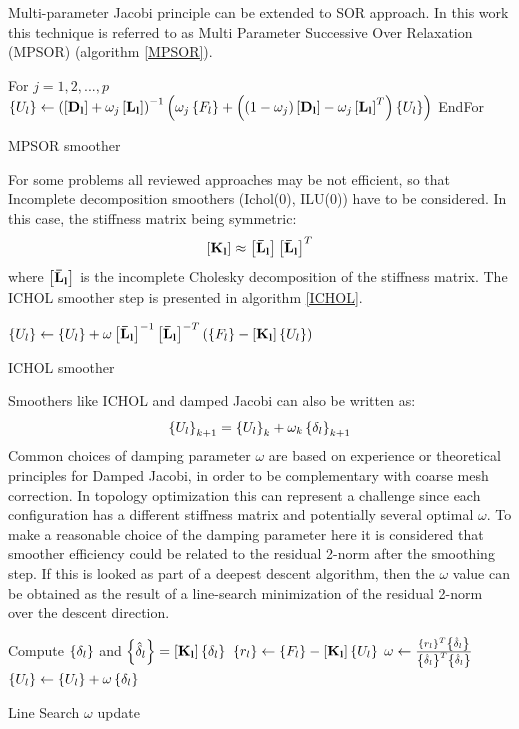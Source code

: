Multi-parameter Jacobi principle can be extended to SOR approach. In this work this technique is referred to as Multi Parameter Successive Over Relaxation (MPSOR) (algorithm \ref{MPSOR}).
 \clearpage
 \begin{algorithm} 
 For $j=1,2,...,p$\;
        $\left\lbrace{U_{l}}\right \rbrace\gets\left(\left[{\mathbf{D_{l}}}\right]+\omega_j\left[{\mathbf{L_{l}}}\right]\right)^{-1}\left(\omega_j\left\lbrace{F_{l}}\right \rbrace+\left((1-\omega_j)\left[{\mathbf{D_{l}}}\right]-\omega_j\left[{\mathbf{L_{l}}}\right]^T\right)\left\lbrace{U_{l}}\right \rbrace\right)$\;
        EndFor\;
        \caption{MPSOR smoother\label{MPSOR}}
 \end{algorithm}
 For some problems all reviewed approaches may be not efficient, so that Incomplete decomposition smoothers (Ichol(0), ILU(0)) have to be considered. In this case, the stiffness matrix being symmetric:
 \begin{equation}
 \left[{\mathbf{K_{l}}}\right]\approx \left[{\mathbf{\bar{L}_{l}}}\right]\left[{\mathbf{\bar{L}_{l}}}\right]^T
 \end{equation}
 where $\left[{\mathbf{\bar{L}_{l}}}\right]$ is the incomplete Cholesky decomposition of the stiffness matrix. 
 The ICHOL smoother step is presented in algorithm \ref{ICHOL}.
 \begin{algorithm} 
      $\left\lbrace{U_{l}}\right \rbrace\gets\left\lbrace{U_{l}}\right \rbrace+\omega\left[{\mathbf{\bar{L}_{l}}}\right]^{-1}{\left[{\mathbf{\bar{L}_{l}}}\right]}^{-T}\left(\left\lbrace{F_{l}}\right \rbrace-\left[{\mathbf{K_{l}}}\right]\left\lbrace{U_{l}}\right \rbrace\right)$\;
         \caption{ICHOL smoother\label{ICHOL}}
  \end{algorithm}
 Smoothers like ICHOL and damped Jacobi can also be written as:
 \begin{equation}
 \left\lbrace{U_{l}}\right \rbrace_{k+1}=\left\lbrace{U_{l}}\right \rbrace_{k}+\omega_k\left\lbrace{\delta_{l}}\right \rbrace_{k+1}
 \end{equation}
 Common choices of damping parameter $\omega$ are based on experience or theoretical principles for Damped Jacobi, in order to be complementary with coarse mesh correction. In topology optimization this can represent a challenge since each configuration has a different stiffness matrix and potentially several optimal $\omega$. To make a reasonable choice of the damping parameter here it is considered that smoother efficiency could be related to the residual 2-norm after the smoothing step. If this is looked as part of a deepest descent algorithm, then the $\omega$ value can be obtained as the result of a line-search minimization of the residual 2-norm over the descent direction. 
  \begin{algorithm} 
  Compute $\left\lbrace{\delta_{l}}\right \rbrace$ and $\left\lbrace{\hat{\delta}_{l}}\right \rbrace=\left[{\mathbf{K_{l}}}\right]\left\lbrace{\delta_{l}}\right \rbrace$\;
  $\left\lbrace{r_{l}}\right \rbrace\gets\left\lbrace{F_{l}}\right \rbrace-\left[{\mathbf{K_{l}}}\right]\left\lbrace{U_{l}}\right \rbrace$\;
  	$\omega\gets\frac{\left\lbrace{r_{l}}\right \rbrace^T\left\lbrace{\hat{\delta}_{l}}\right \rbrace}{\left\lbrace{\hat{\delta}_{l}}\right \rbrace^T\left\lbrace{\hat{\delta}_{l}}\right \rbrace}$\;
       $\left\lbrace{U_{l}}\right \rbrace\gets\left\lbrace{U_{l}}\right \rbrace+\omega\left\lbrace{\delta_{l}}\right \rbrace$\;
          \caption{Line Search $\omega$ update\label{LS}}
   \end{algorithm}

